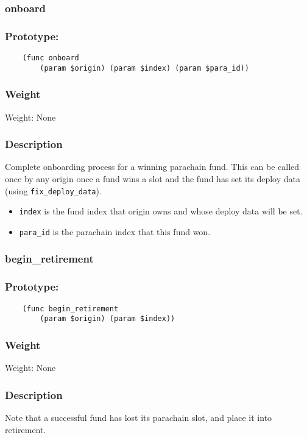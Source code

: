 \documentclass[11pt,a4paper]{article}
\begin{document}
\subsubsection{onboard}
\subsubsection*{Prototype:}
\begin{verbatim}
    (func onboard
        (param $origin) (param $index) (param $para_id))
\end{verbatim}
\subsubsection*{Weight}
Weight: None
\subsubsection*{Description}
Complete onboarding process for a winning parachain fund. This can be called once by any origin once a fund wins a slot and the fund has set its deploy data (using \verb|fix_deploy_data|).

\begin{itemize}
\item \verb|index| is the fund index that origin owns and whose deploy data will be set.
\item \verb|para_id| is the parachain index that this fund won.
\end{itemize}

\subsubsection{begin\_retirement}
\subsubsection*{Prototype:}
\begin{verbatim}
    (func begin_retirement
        (param $origin) (param $index))
\end{verbatim}
\subsubsection*{Weight}
Weight: None
\subsubsection*{Description}
Note that a successful fund has lost its parachain slot, and place it into retirement.
\end{document}
